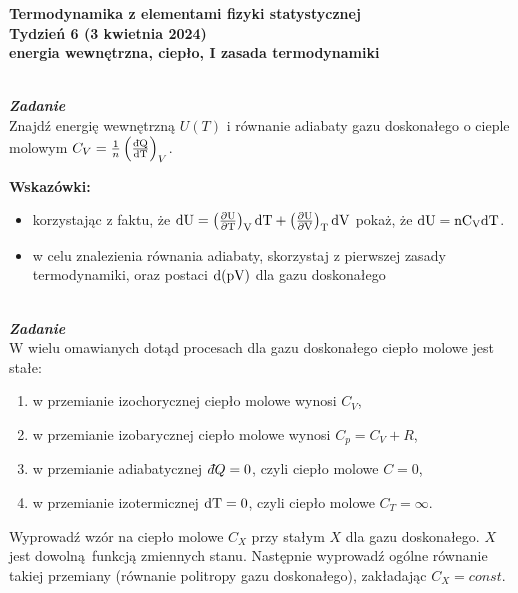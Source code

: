 \documentclass[11pt,a4paper]{article}
\newcounter{zadanie}\newcommand{\zadanie}[1][]{\addtocounter{zadanie}{1} ~\\  {\bf \emph{Zadanie \arabic{zadanie} #1 }} \\}
\newcommand{\dbar}{{\mkern3mu\mathchar'26\mkern-12mu d}}
\begin{document}

\begin{centering}
\bf{\Large{Termodynamika z elementami fizyki statystycznej}}\\
Tydzień 6  (3 kwietnia 2024)\\[3mm]
energia wewnętrzna, ciepło, I zasada termodynamiki \\ 
\end{centering} 
\vspace{5mm}

\zadanie
Znajdź energię wewnętrzną $U(T)$ i równanie adiabaty gazu doskonałego o cieple molowym
$C_V = \frac{1}{n}\left( \frac{\rm{\dbar}Q}{\rm{d}T}\right)_V$.

\textbf{Wskazówki:}
\begin{itemize}
  \item korzystając z faktu, że
    $\rm{d}U = \left(\frac{\partial U}{\partial T}\right)_V \rm{d}T + \left(\frac{\partial U}{\partial V}\right)_T \rm{d}V$
    pokaż, że $\rm{d}U = n C_V \rm{d}T$.
  \item w celu znalezienia równania adiabaty, skorzystaj z pierwszej zasady termodynamiki,
    oraz postaci $\rm{d}(pV)$ dla gazu doskonałego\\
\end{itemize}
\zadanie
W wielu omawianych dotąd procesach dla gazu doskonałego ciepło molowe jest stałe:
\begin{enumerate}
\item w przemianie izochorycznej ciepło molowe wynosi $C_V$,
\item w przemianie izobarycznej ciepło molowe wynosi $C_p = C_V + R$,
\item w przemianie adiabatycznej $\dbar Q = 0$, czyli ciepło molowe $C = 0$,
\item w przemianie izotermicznej $\rm{d}T = 0$, czyli ciepło molowe $C_T = \infty$.
\end{enumerate}
Wyprowadź wzór na ciepło molowe $C_X$ przy stałym $X$ dla gazu doskonałego.
$X$ jest dowolną funkcją zmiennych stanu. Następnie wyprowadź ogólne równanie 
takiej przemiany (równanie politropy gazu doskonałego), zakładając $C_X=const$.
\end{document}
